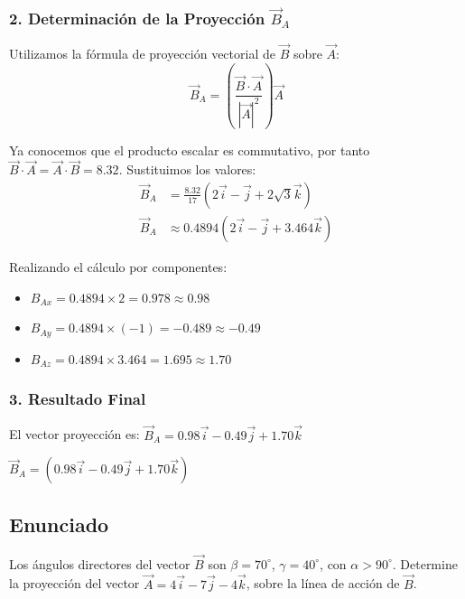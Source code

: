 \documentclass[12pt, a4paper]{article}
\begin{document}
\subsubsection*{2. Determinación de la Proyección $\vec{B}_A$}
Utilizamos la fórmula de proyección vectorial de $\vec{B}$ sobre $\vec{A}$:
\begin{equation*}
    \vec{B}_A = \left( \frac{\vec{B} \cdot \vec{A}}{|\vec{A}|^2} \right) \vec{A}
\end{equation*}

Ya conocemos que el producto escalar es commutativo, por tanto $\vec{B} \cdot \vec{A} = \vec{A} \cdot \vec{B} = 8.32$. Sustituimos los valores:
\begin{align*}
    \vec{B}_A &= \frac{8.32}{17} (2\vec{i} - \vec{j} + 2\sqrt{3}\vec{k}) \\
    \vec{B}_A &\approx 0.4894 (2\vec{i} - \vec{j} + 3.464\vec{k})
\end{align*}

Realizando el cálculo por componentes:
\begin{itemize}
    \item $B_{Ax} = 0.4894 \times 2 = 0.978 \approx 0.98$
    \item $B_{Ay} = 0.4894 \times (-1) = -0.489 \approx -0.49$
    \item $B_{Az} = 0.4894 \times 3.464 = 1.695 \approx 1.70$
\end{itemize}

\subsubsection*{3. Resultado Final}
El vector proyección es: $\vec{B}_A = 0.98\vec{i} - 0.49\vec{j} + 1.70\vec{k}$

\begin{tcolorbox}[colback=green!5!white, colframe=green!50!black, title=Respuesta Final]
\centering \Large $\vec{B}_A = (0.98\vec{i} - 0.49\vec{j} + 1.70\vec{k})$
\end{tcolorbox}

\newpage

\subsection*{Enunciado}
Los ángulos directores del vector $\vec{B}$ son $\beta = 70^\circ$, $\gamma = 40^\circ$, con $\alpha > 90^\circ$. Determine la proyección del vector $\vec{A} = 4\vec{i} - 7\vec{j} - 4\vec{k}$, sobre la línea de acción de $\vec{B}$.
\end{document}
